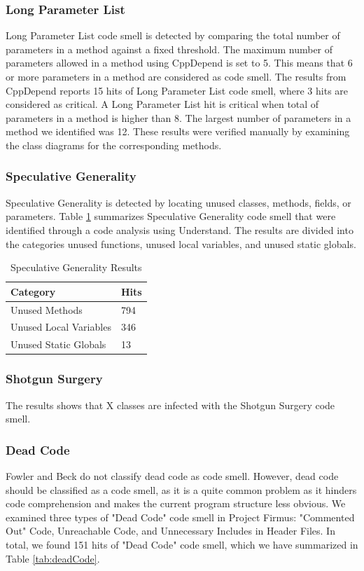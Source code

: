 \subsubsection{Long Parameter List}
Long Parameter List code smell is detected by comparing the total number of parameters in a method against a fixed threshold. The maximum number of parameters allowed in a method using CppDepend is set to 5. This means that 6 or more parameters in a method are considered as code smell. The results from CppDepend reports 15 hits of Long Parameter List code smell, where 3 hits are considered as critical. A Long Parameter List hit is critical when total of parameters in a method is higher than 8. The largest number of parameters in a method we identified was 12. These results were verified manually by examining the class diagrams for the corresponding methods.

\subsubsection{Speculative Generality}
Speculative Generality is detected by locating unused classes, methods, fields, or parameters. Table \ref{tab:speculativeGenerality} summarizes Speculative Generality code smell that were identified through a code analysis using Understand. The results are divided into the categories unused functions, unused local variables, and unused static globals. 

\begin{table}[]
\centering
\caption{Speculative Generality Results}
\label{tab:speculativeGenerality}
\begin{tabular}{|l|l|}
\hline
\textbf{Category}		& 	\textbf{Hits} \\ \hline
Unused Methods 			&	794  \\ \hline
Unused Local Variables 	& 	346	 \\ \hline
Unused Static Globals 	& 	13	 \\ \hline
\end{tabular}
\end{table}

\subsubsection{Shotgun Surgery}
The results shows that X classes are infected with the Shotgun Surgery code smell. 



\subsubsection{Dead Code}
Fowler and Beck\cite{1999:RID:311424} do not classify dead code as code smell. However, dead code should be classified as a code smell, as it is a quite common problem as it hinders code comprehension and makes the current program structure less obvious\cite{mantyla2003taxonomy}. We examined three types of "Dead Code" code smell in Project Firmus: "Commented Out" Code, Unreachable Code, and Unnecessary Includes in Header Files. In total, we found 151 hits of "Dead Code" code smell, which we have summarized in Table \ref{tab:deadCode}.

